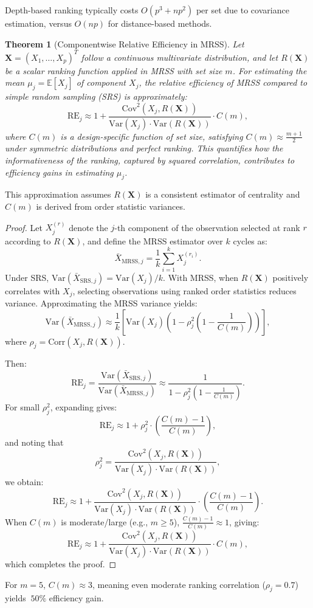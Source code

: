 \documentclass[12pt]{article}
\newtheorem{theorem}{Theorem}[section]
\begin{document}
Depth-based ranking typically costs $O(p^3 + np^2)$ per set due to covariance estimation, versus $O(np)$ for distance-based methods.
\begin{theorem}[Componentwise Relative Efficiency in MRSS]
\label{thm:mrss_efficiency}
Let $\mathbf{X} = (X_1, \ldots, X_p)^T$ follow a continuous multivariate distribution, and let $R(\mathbf{X})$ be a scalar ranking function applied in MRSS with set size $m$. For estimating the mean $\mu_j = \mathbb{E}[X_j]$ of component $X_j$, the relative efficiency of MRSS compared to simple random sampling (SRS) is approximately:
\[
\text{RE}_j \approx 1 + \frac{\text{Cov}^2(X_j, R(\mathbf{X}))}{\text{Var}(X_j) \cdot \text{Var}(R(\mathbf{X}))} \cdot C(m),
\]
where $C(m)$ is a design-specific function of set size, satisfying $C(m) \approx \frac{m+1}{2}$ under symmetric distributions and perfect ranking. This quantifies how the informativeness of the ranking, captured by squared correlation, contributes to efficiency gains in estimating $\mu_j$.
\end{theorem}
This approximation assumes $R(\mathbf{X})$ is a consistent estimator of centrality and $C(m)$ is derived from order statistic variances.
\begin{proof}
Let $X_j^{(r)}$ denote the $j$-th component of the observation selected at rank $r$ according to $R(\mathbf{X})$, and define the MRSS estimator over $k$ cycles as:
\[
\bar{X}_{\text{MRSS},j} = \frac{1}{k} \sum_{i=1}^k X_j^{(r_i)}.
\]
Under SRS, $\text{Var}(\bar{X}_{\text{SRS},j}) = \text{Var}(X_j)/k$. With MRSS, when $R(\mathbf{X})$ positively correlates with $X_j$, selecting observations using ranked order statistics reduces variance. Approximating the MRSS variance yields:
\[
\text{Var}(\bar{X}_{\text{MRSS},j}) \approx \frac{1}{k} \left[ \text{Var}(X_j) \left(1 - \rho_j^2 \left(1 - \frac{1}{C(m)} \right) \right) \right],
\]
where $\rho_j = \text{Corr}(X_j, R(\mathbf{X}))$.

Then:
\[
\text{RE}_j = \frac{\text{Var}(\bar{X}_{\text{SRS},j})}{\text{Var}(\bar{X}_{\text{MRSS},j})} \approx \frac{1}{1 - \rho_j^2 \left(1 - \frac{1}{C(m)} \right)}.
\]
For small $\rho_j^2$, expanding gives:
\[
\text{RE}_j \approx 1 + \rho_j^2 \cdot \left(\frac{C(m) - 1}{C(m)}\right),
\]
and noting that
\[
\rho_j^2 = \frac{\text{Cov}^2(X_j, R(\mathbf{X}))}{\text{Var}(X_j) \cdot \text{Var}(R(\mathbf{X}))},
\]
we obtain:
\[
\text{RE}_j \approx 1 + \frac{\text{Cov}^2(X_j, R(\mathbf{X}))}{\text{Var}(X_j) \cdot \text{Var}(R(\mathbf{X}))} \cdot \left(\frac{C(m) - 1}{C(m)}\right).
\]
When $C(m)$ is moderate/large (e.g., $m \geq 5$), $\frac{C(m) - 1}{C(m)} \approx 1$, giving:
\[
\text{RE}_j \approx 1 + \frac{\text{Cov}^2(X_j, R(\mathbf{X}))}{\text{Var}(X_j) \cdot \text{Var}(R(\mathbf{X}))} \cdot C(m),
\]
which completes the proof.
\end{proof}
For $m=5$, $C(m) \approx 3$, meaning even moderate ranking correlation ($\rho_j=0.7$) yields $~50\%$ efficiency gain.
\end{document}
